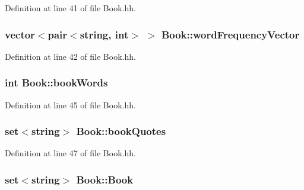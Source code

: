 Definition at line 41 of file Book.\+hh.

\hypertarget{class_book_ac58a87d14a302f7d437c1eaa1f1901fb}{
\subsubsection[{word\+Frequency\+Vector}]{\setlength{\rightskip}{0pt plus 5cm}vector$<$pair$<$string, int$>$ $>$ Book\+::word\+Frequency\+Vector\hspace{0.3cm}{\ttfamily [private]}}}\label{class_book_ac58a87d14a302f7d437c1eaa1f1901fb}


Definition at line 42 of file Book.\+hh.

\hypertarget{class_book_a36f1e0b30a0ad17606976556cab45a23}{
\subsubsection[{book\+Words}]{\setlength{\rightskip}{0pt plus 5cm}int Book\+::book\+Words\hspace{0.3cm}{\ttfamily [private]}}}\label{class_book_a36f1e0b30a0ad17606976556cab45a23}


Definition at line 45 of file Book.\+hh.

\hypertarget{class_book_a370478eab144c20de936e1b68923e1c0}{
\subsubsection[{book\+Quotes}]{\setlength{\rightskip}{0pt plus 5cm}set$<$string$>$ Book\+::book\+Quotes\hspace{0.3cm}{\ttfamily [private]}}}\label{class_book_a370478eab144c20de936e1b68923e1c0}


Definition at line 47 of file Book.\+hh.

\hypertarget{class_book_a5fea5dce5ba03d79378b2000f255de49}{
\subsubsection[{Book}]{\setlength{\rightskip}{0pt plus 5cm}set$<$string$>$ Book\+::\+Book}}\label{class_book_a5fea5dce5ba03d79378b2000f255de49}


